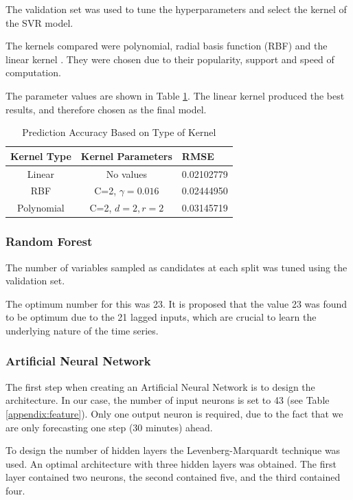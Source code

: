 The validation set was used to tune the hyperparameters and select the kernel of the SVR model.

The kernels compared were polynomial, radial basis function (RBF) and the linear kernel \cite{Chang2010, theodoridis2009pattern}. They were chosen due to their popularity, support and speed of computation.

The parameter values are shown in Table \ref{tab:kernel}. The linear kernel produced the best results, and therefore chosen as the final model.
\begin{table}
	\caption{Prediction Accuracy Based on Type of Kernel}
	\label{tab:kernel}
	\begin{tabular}{ccl}
		\toprule
		Kernel Type& Kernel Parameters & RMSE\\
		\midrule
		Linear & No values & 0.02102779\\
		RBF & C=2, $\gamma=0.016$ & 0.02444950\\
		Polynomial & C=2, $d=2, r=2$ & 0.03145719 \\
		\bottomrule
	\end{tabular}
\end{table}
\subsubsection{Random Forest}
The number of variables sampled as candidates at each split was tuned using the validation set.

The optimum number for this was 23. It is proposed that the value 23 was found to be optimum due to the 21 lagged inputs, which are crucial to learn the underlying nature of the time series.


\subsubsection{Artificial Neural Network}

The first step when creating an Artificial Neural Network is to design the architecture. In our case, the number of input neurons is set to 43 (see Table \ref{appendix:feature}). Only one output neuron is required, due to the fact that we are only forecasting one step (30 minutes) ahead.

To design the number of hidden layers the Levenberg-Marquardt technique was used. An optimal architecture with three hidden layers was obtained. The first layer contained two neurons, the second contained five, and the third contained four.

